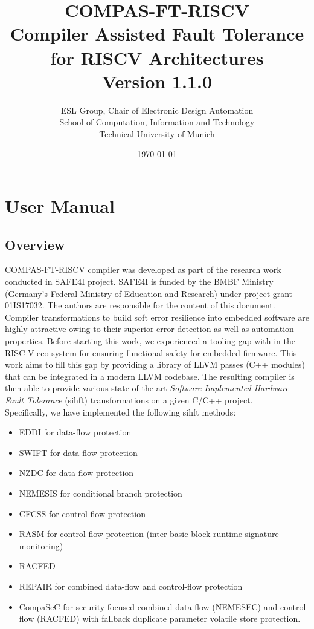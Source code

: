 \documentclass[12pt]{report}
\date{\today}
\title{
\textbf{COMPAS-FT-RISCV} \\
\large Compiler Assisted Fault Tolerance for RISCV Architectures \\
\small Version 1.1.0
}
\author{
ESL Group, Chair of Electronic Design Automation \\
School of Computation, Information and Technology \\
Technical University of Munich
}
\begin{document}
\maketitle

\tableofcontents
\listoffigures

\newpage
\printacronyms

\chapter{User Manual}

\section{Overview}
COMPAS-FT-RISCV compiler was developed as part of the research work conducted in SAFE4I project. SAFE4I is funded by
the BMBF Ministry (Germany's Federal Ministry of Education and Research) under project grant 01IS17032. The authors
are responsible for the content of this document. \\

Compiler transformations to build soft error resilience into embedded software are highly attractive owing to their
superior error detection as well as automation properties. Before starting this work, we experienced a tooling
gap with in the RISC-V eco-system for ensuring functional safety for embedded firmware. This work aims to fill this gap
by providing a library of LLVM passes (C++ modules) that can be integrated in a modern LLVM codebase.
The resulting compiler is then able to provide various state-of-the-art
\textit{Software Implemented Hardware Fault Tolerance} (\ac{sihft}) transformations on a given C/C++ project. \\

Specifically, we have implemented the following \ac{sihft} methods:
\begin{itemize}
 \item{EDDI \cite{eddi} for data-flow protection}
 \item{SWIFT \cite{swift} for data-flow protection}
 \item{NZDC \cite{nzdc} for data-flow protection}
 \item{NEMESIS \cite{nemesis} for conditional branch protection}
 \item{CFCSS \cite{cfcss} for control flow protection}
 \item{RASM \cite{rasm} for control flow protection (inter basic block runtime signature monitoring)}
 \item{RACFED \cite{racfed for control flow protection (inter and intra block runtime signature monitoring)}}
 \item{REPAIR \cite{repair} for combined data-flow and control-flow protection}
 \item{CompaSeC \cite{compasec} for security-focused combined data-flow (NEMESEC) and control-flow (RACFED) with fallback duplicate parameter volatile store protection.}
\end{itemize}
\end{document}
